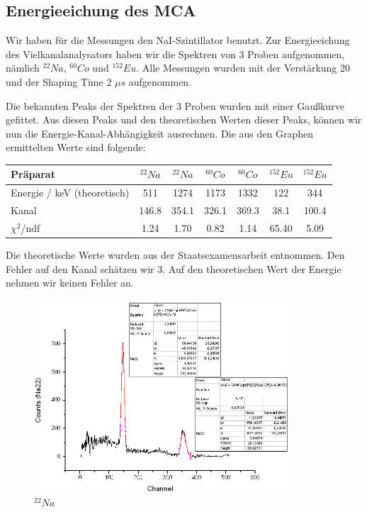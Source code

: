 \subsection{Energieeichung des MCA}

Wir haben für die Messungen den NaI-Szintillator benutzt. Zur Energieeichung des Vielkanalanalysators haben wir die Spektren von 3 Proben aufgenommen, nämlich $^{22}Na$, $^{60}Co$ und $^{152}Eu$. Alle Messungen wurden mit der Verstärkung 20 und der Shaping Time 2 $\mu s$ aufgenommen.

Die bekannten Peaks der Spektren der 3 Proben wurden mit einer Gaußkurve gefittet. Aus diesen Peaks und den theoretischen Werten dieser Peaks, können wir nun die Energie-Kanal-Abhängigkeit ausrechnen. Die aus den Graphen ermittelten Werte sind folgende:\\

\begin{center}
\begin{tabular}{| l | c | c | c | c | c | c |} \hline
Präparat & $^{22}Na$ & $^{22}Na$ & $^{60}Co$ & $^{60}Co$ & $^{152}Eu$ & $^{152}Eu$\\ \hline
Energie / keV (theoretisch) & 511 & 1274 & 1173 & 1332 & 122 & 344\\ \hline
Kanal & 146.8 & 354.1 & 326.1 & 369.3 & 38.1 & 100.4\\ \hline
$\chi^2$/ndf & 1.24 & 1.70 & 0.82 & 1.14 & 65.40 & 5.09\\ \hline
\end{tabular}
\end{center}

Die theoretische Werte wurden aus der Staatsexamensarbeit entnommen. Den Fehler auf den Kanal schätzen wir 3. Auf den theoretischen Wert der Energie nehmen wir keinen Fehler an. %

\begin{figure}
\centering \includegraphics[width = 0.85\textwidth]{auswertung/Na22.png}
\caption{$^{22}Na$}
\end{figure}

